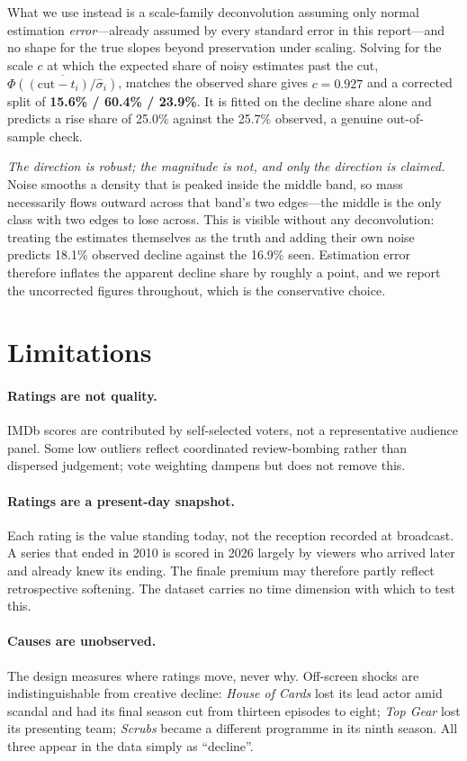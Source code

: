 \documentclass[11pt,a4paper]{article}
\begin{document}
What we use instead is a scale-family deconvolution assuming only normal
estimation \emph{error}---already assumed by every standard error in this
report---and no shape for the true slopes beyond preservation under scaling.
Solving for the scale $c$ at which the expected share of noisy estimates past the
cut, $\overline{\Phi((\text{cut}-t_i)/\hat\sigma_i)}$, matches the observed share
gives $c = 0.927$ and a corrected split of \textbf{15.6\% / 60.4\% / 23.9\%}. It
is fitted on the decline share alone and predicts a rise share of 25.0\% against
the 25.7\% observed, a genuine out-of-sample check.

\emph{The direction is robust; the magnitude is not, and only the direction is
claimed.} Noise smooths a density that is peaked inside the middle band, so mass
necessarily flows outward across that band's two edges---the middle is the only
class with two edges to lose across. This is visible without any deconvolution:
treating the estimates themselves as the truth and adding their own noise predicts
18.1\% observed decline against the 16.9\% seen. Estimation error therefore
inflates the apparent decline share by roughly a point, and we report the
uncorrected figures throughout, which is the conservative choice.

\FloatBarrier
\section{Limitations}

\paragraph{Ratings are not quality.}
IMDb scores are contributed by self-selected voters, not a representative
audience panel. Some low outliers reflect coordinated review-bombing rather
than dispersed judgement; vote weighting dampens but does not remove this.

\paragraph{Ratings are a present-day snapshot.}
Each rating is the value standing today, not the reception recorded at
broadcast. A series that ended in 2010 is scored in 2026 largely by viewers who
arrived later and already knew its ending. The finale premium may therefore
partly reflect retrospective softening. The dataset carries no time dimension
with which to test this.

\paragraph{Causes are unobserved.}
The design measures where ratings move, never why. Off-screen shocks are
indistinguishable from creative decline: \emph{House of Cards} lost its lead
actor amid scandal and had its final season cut from thirteen episodes to
eight; \emph{Top Gear} lost its presenting team; \emph{Scrubs} became a
different programme in its ninth season. All three appear in the data simply as
``decline''.
\end{document}
